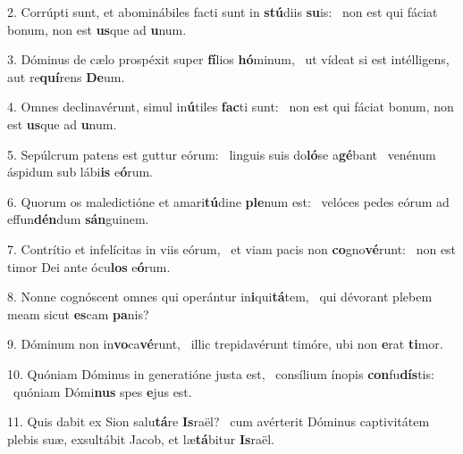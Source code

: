 2. Corrúpti sunt, et abominábiles facti sunt in \textbf{stú}diis \textbf{su}is: \ast\  non est qui fáciat bonum, non est \textbf{us}que ad \textbf{u}num.\

3. Dóminus de cælo prospéxit super \textbf{fí}lios \textbf{hó}minum, \ast\  ut vídeat si est intélligens, aut re\textbf{quí}rens \textbf{De}um.\

4. Omnes declinavérunt, simul in\textbf{ú}tiles \textbf{fac}ti sunt: \ast\  non est qui fáciat bonum, non est \textbf{us}que ad \textbf{u}num.\

5. Sepúlcrum patens est guttur eórum: \dag\  linguis suis do\textbf{ló}se a\textbf{gé}bant \ast\  venénum áspidum sub lábi\textbf{is} e\textbf{ó}rum.\

6. Quorum os maledictióne et amari\textbf{tú}dine \textbf{ple}num est: \ast\  velóces pedes eórum ad effun\textbf{dén}dum \textbf{sán}guinem.\

7. Contrítio et infelícitas in viis eórum, \dag\  et viam pacis non \textbf{co}gno\textbf{vé}runt: \ast\  non est timor Dei ante ócu\textbf{los} e\textbf{ó}rum.\

8. Nonne cognóscent omnes qui operántur in\textbf{i}qui\textbf{tá}tem, \ast\  qui dévorant plebem meam sicut \textbf{es}cam \textbf{pa}nis?\

9. Dóminum non in\textbf{vo}ca\textbf{vé}runt, \ast\  illic trepidavérunt timóre, ubi non \textbf{e}rat \textbf{ti}mor.\

10. Quóniam Dóminus in generatióne justa est, \dag\  consílium ínopis \textbf{con}fu\textbf{dís}tis: \ast\  quóniam Dómi\textbf{nus} spes \textbf{e}jus est.\

11. Quis dabit ex Sion salu\textbf{tá}re \textbf{Is}raël? \ast\  cum avérterit Dóminus captivitátem plebis suæ, exsultábit Jacob, et læ\textbf{tá}bitur \textbf{Is}raël.\


